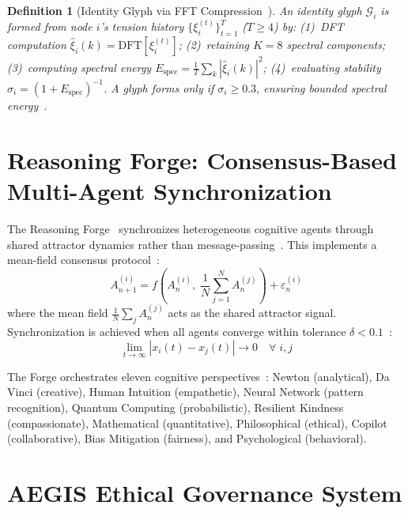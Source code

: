 \documentclass[conference]{IEEEtran}
\newtheorem{definition}{Definition}
\begin{document}
\begin{definition}[Identity Glyph via FFT Compression~\cite{harrison2026codettefull}]
\label{def:glyph}
An identity glyph $\mathcal{G}_i$ is formed from node $i$'s tension history $\{\xi_i^{(t)}\}_{t=1}^{T}$ ($T \geq 4$) by: (1)~DFT computation $\hat{\xi}_i(k) = \text{DFT}[\xi_i^{(t)}]$; (2)~retaining $K = 8$ spectral components; (3)~computing spectral energy $E_{\text{spec}} = \frac{1}{T}\sum_k |\hat{\xi}_i(k)|^2$; (4)~evaluating stability $\sigma_i = (1 + E_{\text{spec}})^{-1}$. A glyph forms only if $\sigma_i \geq 0.3$, ensuring bounded spectral energy~\cite{kelso1995dynamic}.
\end{definition}

\section{Reasoning Forge: Consensus-Based Multi-Agent Synchronization}
\label{sec:forge}

The Reasoning Forge~\cite{harrison2026codettefull} synchronizes heterogeneous cognitive agents through shared attractor dynamics rather than message-passing~\cite{wooldridge2009introduction}. This implements a mean-field consensus protocol~\cite{olfatisaber2007consensus,lasry2007mean}:
\begin{equation}
  A_{n+1}^{(i)} = f\!\left(A_n^{(i)},\; \frac{1}{N}\sum_{j=1}^{N} A_n^{(j)}\right) + \varepsilon_n^{(i)}
  \label{eq:forge_update}
\end{equation}
where the mean field $\frac{1}{N}\sum_j A_n^{(j)}$ acts as the shared attractor signal. Synchronization is achieved when all agents converge within tolerance $\delta < 0.1$~\cite{harrison2026codettefull}:
\begin{equation}
  \lim_{t \to \infty} |x_i(t) - x_j(t)| \to 0 \quad \forall\; i, j
  \label{eq:consensus}
\end{equation}

The Forge orchestrates eleven cognitive perspectives~\cite{harrison2026codettefull}: Newton (analytical), Da Vinci (creative), Human Intuition (empathetic), Neural Network (pattern recognition), Quantum Computing (probabilistic), Resilient Kindness (compassionate), Mathematical (quantitative), Philosophical (ethical), Copilot (collaborative), Bias Mitigation (fairness), and Psychological (behavioral).

\section{AEGIS Ethical Governance System}
\label{sec:aegis}
\end{document}
